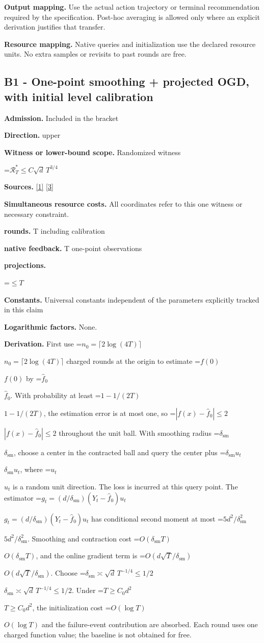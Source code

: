 \documentclass[10pt,a4paper]{article}
\newcommand{\AtlasMath}[1]{\par\begingroup\centering\setbox0=\hbox{$\displaystyle #1$}\ifdim\wd0>1.4\linewidth\typeout{ATLAS WIDE FORMULA: \the\wd0}\fi\ifdim\wd0>\linewidth\resizebox{\linewidth}{!}{\box0}\else\box0\fi\par\endgroup}
\newcommand{\AtlasInlineMath}[1]{\begingroup\setbox0=\hbox{$#1$}\ifdim\wd0>.4\linewidth\endgroup\AtlasMath{#1}\else\endgroup$#1$\fi}
\begin{document}
\textbf{Output mapping.} Use the actual action trajectory or terminal recommendation required by the specification. Post-hoc averaging is allowed only where an explicit derivation justifies that transfer.

\textbf{Resource mapping.} Native queries and initialization use the declared resource units. No extra samples or revisits to past rounds are free.

\subsection{B1 - One-point smoothing + projected OGD, with initial level calibration}
\textbf{Admission.} Included in the bracket

\textbf{Direction.} upper

\textbf{Witness or lower-bound scope.} Randomized witness

\AtlasMath{\mathcal{R}_T^*\le C\sqrt d\,T^{3/4}}
\textbf{Sources.} \href{https://arxiv.org/pdf/2406.06506v1}{[1]} \href{https://www.lamda.nju.edu.cn/lusy/pdf/zhang2018adaptive.pdf}{[3]}

\textbf{Simultaneous resource costs.} All coordinates refer to this one witness or necessary constraint.

\textbf{rounds.} T including calibration

\textbf{native feedback.} T one-point observations

\textbf{projections.}

\AtlasMath{\le T}
\textbf{Constants.} Universal constants independent of the parameters explicitly tracked in this claim

\textbf{Logarithmic factors.} None.

\textbf{Derivation.} First use \AtlasInlineMath{n_0=\lceil2\log(4T)\rceil} charged rounds at the origin to estimate \AtlasInlineMath{f(0)} by \AtlasInlineMath{\widehat f_0}. With probability at least \AtlasInlineMath{1-1/(2T)}, the estimation error is at most one, so \AtlasInlineMath{|f(x)-\widehat f_0|\le2} throughout the unit ball. With smoothing radius \AtlasInlineMath{\delta_{\mathrm{sm}}}, choose a center in the contracted ball and query the center plus \AtlasInlineMath{\delta_{\mathrm{sm}} u_t}, where \AtlasInlineMath{u_t} is a random unit direction. The loss is incurred at this query point. The estimator \AtlasInlineMath{g_t=(d/\delta_{\mathrm{sm}})(Y_t-\widehat f_0)u_t} has conditional second moment at most \AtlasInlineMath{5d^2/\delta_{\mathrm{sm}}^2}. Smoothing and contraction cost \AtlasInlineMath{O(\delta_{\mathrm{sm}} T)}, and the online gradient term is \AtlasInlineMath{O(d\sqrt T/\delta_{\mathrm{sm}})}. Choose \AtlasInlineMath{\delta_{\mathrm{sm}}\asymp\sqrt d\,T^{-1/4}\le1/2}. Under \AtlasInlineMath{T\ge C_0d^2}, the initialization cost \AtlasInlineMath{O(\log T)} and the failure-event contribution are absorbed. Each round uses one charged function value; the baseline is not obtained for free.
\end{document}
